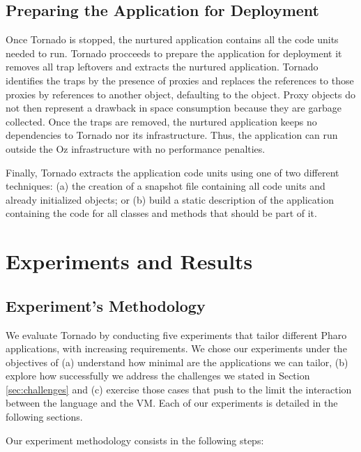 \subsection{Preparing the Application for Deployment}\label{sec:deploy}

Once Tornado is stopped, the nurtured application contains all the code units needed to run. Tornado procceeds to prepare the application for deployment \ie it removes all trap leftovers and extracts the nurtured application. Tornado identifies the traps by the presence of proxies and replaces the references to those proxies by references to another object, defaulting to the  object. Proxy objects do not then represent a drawback in space consumption because they are garbage collected. Once the traps are removed, the nurtured application keeps no dependencies to Tornado nor its infrastructure. Thus, the application can run outside the Oz infrastructure with no performance penalties.

Finally, Tornado extracts the application code units using one of two different techniques: (a) the creation of a snapshot file containing all code units and already initialized objects; or (b) build a static description of the application containing the code for all classes and methods that should be part of it.


\section{Experiments and Results}\label{sec:results}

\subsection{Experiment's Methodology}
We evaluate Tornado by conducting five experiments that tailor different Pharo applications, with increasing requirements. We chose our experiments under the objectives of (a) understand how minimal are the applications we can tailor, (b) explore how successfully we address the challenges we stated in Section \ref{sec:challenges} and (c) exercise those cases that push to the limit the interaction between the language and the VM. Each of our experiments is detailed in the following sections.

Our experiment methodology consists in the following steps:

